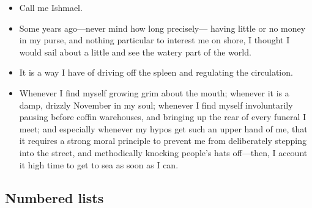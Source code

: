 \documentclass{article}
\begin{document}
\begin{itemize}
  \item Call me Ishmael.
  \item Some years ago---never mind how long precisely---
    having little or no money in my purse, and nothing particular to
    interest me on shore, I thought I would sail about a little and see
    the watery part of the world.
  \item It is a way I have of driving off the
    spleen and regulating the circulation.
  \item Whenever I find myself growing grim about the mouth; whenever it is a damp, drizzly
    November in my soul; whenever I find myself involuntarily pausing
    before coffin warehouses, and bringing up the rear of every funeral
    I meet; and especially whenever my hypos get such an upper hand of me,
    that it requires a strong moral principle to prevent me from
    deliberately stepping into the street, and methodically knocking
    people's hats off---then, I account it high time to get to sea as
    soon as I can.
\end{itemize}

\subsection{Numbered lists}
\end{document}
